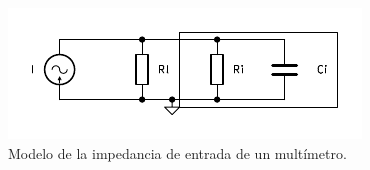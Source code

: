 \begin{figure}[H]
    \centering
    \includegraphics[width=\columnwidth]{img/circ/voltmeter.pdf}
    \caption{Modelo de la impedancia de entrada de un multímetro.}
    \label{fig:voltmeter}
\end{figure}